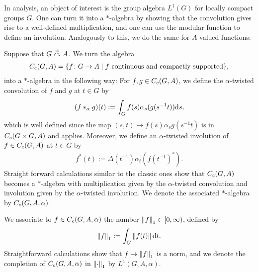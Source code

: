 
In analysis, an object of interest is the group algebra $L^1(G)$ for locally compact groups $G$. One can turn it into a $*$-algebra by showing that the convolution gives rise to a well-defined multiplication, and one can use the modular function to define an involution. Analogously to this, we do the same for $A$ valued functions:
\begin{definition}
Suppose that $G \stackrel{\alpha}{\curvearrowright} A$. We turn the algebra
\begin{align*}
	C_c(G,A)=\{ f \colon G \to A \mid f \text{ continuous and compactly supported}\},
\end{align*}
into a $*$-algebra in the following way: For $f,g \in C_c(G,A)$, we define the $\alpha$-twisted convolution of $f$ and $g$ at $t \in G$ by 
\begin{align*}
	(f \ast_\alpha g)(t):= \int_G  f(s) \alpha_s(g(s^{-1}t)) \mathrm{d} s,
\end{align*}
which is well defined since the map $(s,t) \mapsto f(s) \alpha_s g(s^{-1}t)$ is in $C_c(G \times G , A)$ and  applies. Moreover, we define an $\alpha$-twisted involution of $f \in C_c(G,A)$ at $t \in G$ by
\begin{align*}
	f^*(t):=\Delta(t^{-1}) \alpha_t(f(t^{-1})^*).
\end{align*}
Straight forward calculations similar to the classic ones show that $C_c(G,A)$ becomes a $*$-algebra with multiplication given by the $\alpha$-twisted convolution and involution given by the $\alpha$-twisted involution. We denote the associated $*$-algebra by $C_c(G,A,\alpha)$.

We associate to $f \in C_c(G,A,\alpha)$ the number $\left\lVert f \right\rVert_1 \in [0, \infty)$, defined by
	\begin{align*}
		\left\lVert f \right\rVert_1 := \int_G \left\lVert f(t) \right\rVert \mathrm{d} t.
	\end{align*}
Straightforward calculations show that $f \mapsto \left\lVert f \right\rVert_1$ is a norm, and we denote the completion of $C_c(G,A,\alpha)$ in $\left\lVert \cdot \right\rVert_1$ by $L^1(G,A,\alpha)$.
\end{definition}
